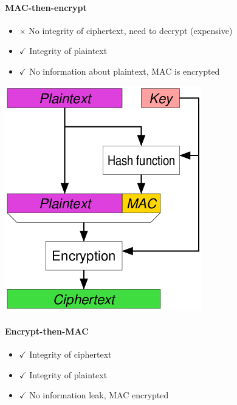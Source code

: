 \documentclass{article}
\newenvironment{Figure}
  {\par\medskip\noindent\minipage{\linewidth}}
  {\endminipage\par\medskip}
\newcommand{\xmark}{\times}
\newenvironment{myitemize}
{ \begin{itemize}
    \setlength{\itemsep}{005pt}
    \setlength{\parskip}{0pt}
    \setlength{\parsep}{0pt}     }
{ \end{itemize}                  }
\begin{document}
\begin{multicols}{2}
\paragraph{MAC-then-encrypt}

\begin{myitemize}
     \item[$\xmark$] No integrity of ciphertext, need to decrypt (expensive)
     \item[$\checkmark$] Integrity of plaintext
     \item[$\checkmark$] No information about plaintext, MAC is encrypted
\end{myitemize}

\begin{Figure}
 \centering
 \includegraphics[width=\linewidth]{img/w4_applied_crypto_mac-then-encrypt.png}
\end{Figure}


\paragraph{Encrypt-then-MAC}


\begin{myitemize}
     \item[$\checkmark$] Integrity of ciphertext
     \item[$\checkmark$] Integrity of plaintext
     \item[$\checkmark$] No information leak, MAC encrypted
\end{myitemize}


\end{multicols}
\end{document}
